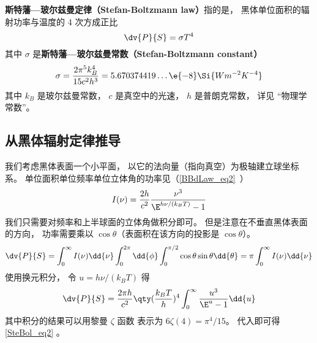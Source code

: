 
\textbf{斯特藩—玻尔兹曼定律（Stefan-Boltzmann law）}指的是， 黑体单位面积的辐射功率与温度的 4 次方成正比
\begin{equation}\label{SteBol_eq2}
\dv{P}{S} = \sigma T^4
\end{equation}
其中 $\sigma$ 是\textbf{斯特藩—玻尔兹曼常数（Stefan-Boltzmann constant）}
\begin{equation}
\sigma = \frac{2\pi^5k_B^4}{15c^2h^3} = 5.670374419\dots \e{-8} \Si{Wm^{-2}K^{-4}}
\end{equation}
其中 $k_B$ 是玻尔兹曼常数， $c$ 是真空中的光速， $h$ 是普朗克常数， 详见 “物理学常数”。

\subsection{从黑体辐射定律推导}

我们考虑黑体表面一个小平面， 以它的法向量（指向真空）为极轴建立球坐标系。 单位面积单位频率单位立体角的功率见（\autoref{BBdLaw_eq2}~）
\begin{equation}\label{SteBol_eq1}
I(\nu) = \frac{2h}{c^2} \frac{\nu^3}{\E^{h\nu/(k_B T)} - 1}
\end{equation}
我们只需要对频率和上半球面的立体角做积分即可。 但是注意在不垂直黑体表面的方向， 功率需要乘以 $\cos\theta$（表面积在该方向的投影是 $\cos\theta$）。
\begin{equation}
\dv{P}{S} = \int_0^\infty I(\nu) \dd{\nu} \int_0^{2\pi} \dd{\phi} \int_0^{\pi/2}\cos\theta\sin\theta\dd{\theta}
= \pi \int_0^\infty I(\nu) \dd{\nu}
\end{equation}
使用换元积分， 令 $u = h\nu/(k_BT)$ 得
\begin{equation}
\dv{P}{S} = \frac{2\pi h}{c^2} \qty(\frac{k_B T}{h})^4 \int_0^\infty \frac{u^3}{\E^u - 1}\dd{u}
\end{equation}
其中积分的结果可以用黎曼 $\zeta$ 函数%
表示为 $6\zeta(4) = \pi^4/15$。 代入即可得\autoref{SteBol_eq2} 。%
